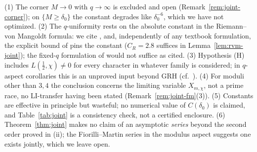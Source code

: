 \begin{remark}\label{rem:joint-scope}
(1) The corner $M\to0$ with $q\to\infty$ is excluded and open
(Remark~\ref{rem:joint-corner}); on $\{M\ge\delta_0\}$ the constant
degrades like $\delta_0^{-6}$, which we have not optimized. (2) The
$q$-uniformity rests on the absolute constant in the Riemann--von
Mangoldt formula: we cite \cite[Theorem~14.5]{MV07}, and,
independently of any textbook formulation, the explicit bound of
\cite[Corollary~1.2]{BMOR21} pins the constant ($C_R=2.8$ suffices in
Lemma~\ref{lem:rvm-joint}); the fixed-$q$ formulation of
\cite[\S16]{Dav00} would not suffice as cited. (3) Hypothesis (H)
includes $L(\tfrac12,\chi)\ne0$ for every
character in whatever family is considered; in $q$-aspect corollaries
this is an unproved input beyond GRH (cf.\ \cite{Sou00}). (4) For
moduli other than $3,4$ the conclusion concerns the limiting variable
$X_{m,\chi}$, not a prime race, no LI-transfer having been stated
(Remark~\ref{rem:joint-fm}(3)). (5) Constants are effective in
principle but wasteful; no numerical value of $C(\delta_0)$ is
claimed, and Table~\ref{tab:joint} is a consistency check, not a
certified enclosure. (6) Theorem~\ref{thm:joint} makes no claim of an
asymptotic \emph{series} beyond the second order proved in (ii); the
Fiorilli--Martin series in the modulus aspect suggests one exists
jointly, which we leave open.
\end{remark}

